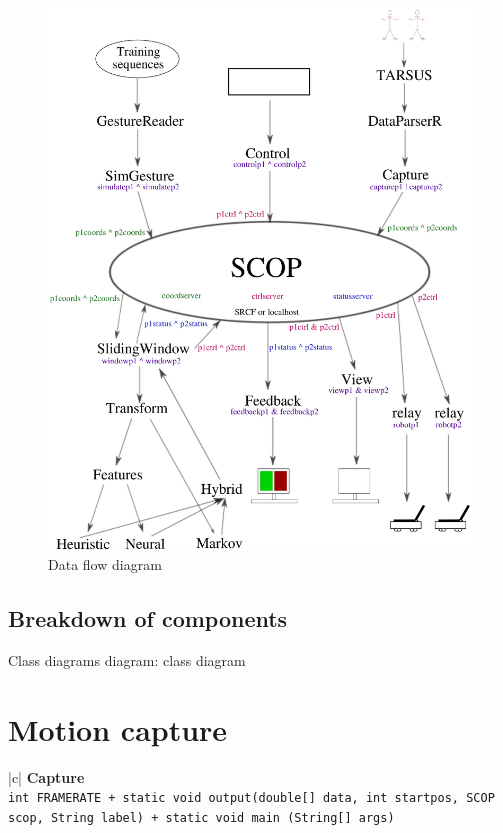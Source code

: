\documentclass[12pt,a4,notitlepage]{report}
\renewcommand{\_}{\texttt{\symbol{95}}}
\newcommand{\<}{\texttt{\symbol{60}}}
\renewcommand{\>}{\texttt{\symbol{62}}}
\newcommand{\class}[1]{\textbf{#1}}
\newcommand{\variable}[1]{\texttt{#1}}
\begin{document}
{\begin{figure}
\centering
\includegraphics[scale=0.75,angle=0]{diagrams/dataflowdiagram.ps}
\caption{Data flow diagram}
\label{dfd}
\end{figure}

\subsection{Breakdown of components}

Class diagrams
{diagram: class diagram}

\section{Motion capture}

\begin{tabular}{|c|} \hline 
\class{Capture} \\ \hline
{}
{ \variable{int FRAME\_RATE \newline
+ static void output(double[] data, int startpos, SCOP scop, String label) \newline
+ static void main (String[] args)
} } \\ \hline
\end{tabular}

}
\end{document}
